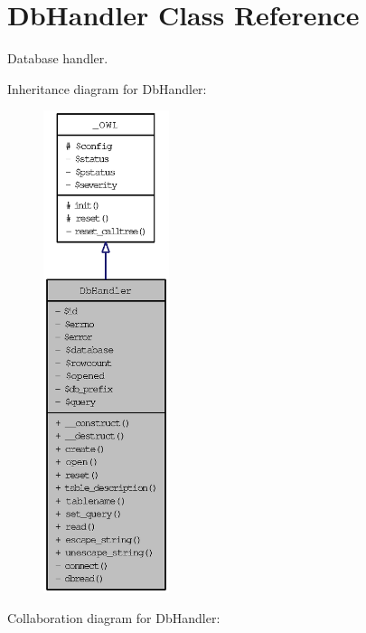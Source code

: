 \hypertarget{classDbHandler}{
\section{DbHandler Class Reference}
\label{classDbHandler}
}
Database handler.  


Inheritance diagram for DbHandler:\nopagebreak
\begin{figure}[H]
\begin{center}
\leavevmode
\includegraphics[height=400pt]{classDbHandler__inherit__graph}
\end{center}
\end{figure}
Collaboration diagram for DbHandler:\nopagebreak
